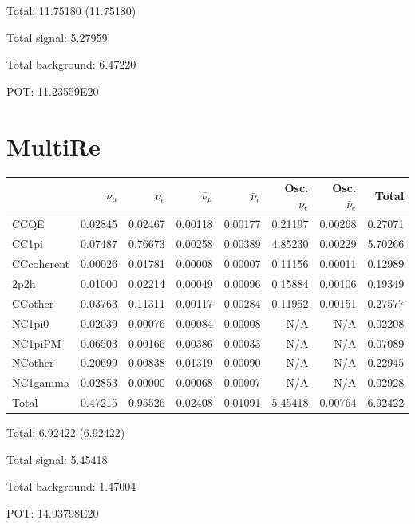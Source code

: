 \documentclass[10pt,a4paper]{article}
\begin{document}
Total: 11.75180    (11.75180)


Total signal: 5.27959


Total background: 6.47220

POT: 11.23559E20



\clearpage


\section*{MultiRe}
\begin{tabular} { | l ||r | r | r | r | r | r | | r | }
\hline
              & $\nu_\mu$            & $\nu_e$              & $\bar{\nu}_{\mu}$    & $\bar{\nu}_{e}$      & Osc. $\nu_e$         & Osc. $\bar{\nu}_{e}$ & Total                \\ \hline\hline
 CCQE         & 0.02845              & 0.02467              & 0.00118              & 0.00177              & 0.21197              & 0.00268              & 0.27071              \\ \hline
 CC1pi        & 0.07487              & 0.76673              & 0.00258              & 0.00389              & 4.85230              & 0.00229              & 5.70266              \\ \hline
 CCcoherent   & 0.00026              & 0.01781              & 0.00008              & 0.00007              & 0.11156              & 0.00011              & 0.12989              \\ \hline
 2p2h         & 0.01000              & 0.02214              & 0.00049              & 0.00096              & 0.15884              & 0.00106              & 0.19349              \\ \hline
 CCother      & 0.03763              & 0.11311              & 0.00117              & 0.00284              & 0.11952              & 0.00151              & 0.27577              \\ \hline
 NC1pi0       & 0.02039              & 0.00076              & 0.00084              & 0.00008              & N/A                  & N/A                  & 0.02208              \\ \hline
 NC1piPM      & 0.06503              & 0.00166              & 0.00386              & 0.00033              & N/A                  & N/A                  & 0.07089              \\ \hline
 NCother      & 0.20699              & 0.00838              & 0.01319              & 0.00090              & N/A                  & N/A                  & 0.22945              \\ \hline
 NC1gamma     & 0.02853              & 0.00000              & 0.00068              & 0.00007              & N/A                  & N/A                  & 0.02928              \\ \hline
\hline
 Total        & 0.47215              & 0.95526              & 0.02408              & 0.01091              & 5.45418              & 0.00764              & 6.92422              \\ \hline

\end{tabular}

Total: 6.92422    (6.92422)


Total signal: 5.45418


Total background: 1.47004

POT: 14.93798E20
\end{document}
